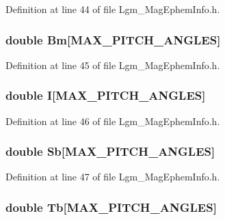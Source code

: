 Definition at line 44 of file Lgm\_\-MagEphemInfo.h.\hypertarget{struct_lgm___mag_ephem_info_58b19efd51438b84ace93c628b985f64}{
\subsubsection[{Bm}]{\setlength{\rightskip}{0pt plus 5cm}double {\bf Bm}\mbox{[}MAX\_\-PITCH\_\-ANGLES\mbox{]}}}
\label{struct_lgm___mag_ephem_info_58b19efd51438b84ace93c628b985f64}




Definition at line 45 of file Lgm\_\-MagEphemInfo.h.\hypertarget{struct_lgm___mag_ephem_info_f7c4c1569cb66f578b4bdef738b7e920}{
\subsubsection[{I}]{\setlength{\rightskip}{0pt plus 5cm}double {\bf I}\mbox{[}MAX\_\-PITCH\_\-ANGLES\mbox{]}}}
\label{struct_lgm___mag_ephem_info_f7c4c1569cb66f578b4bdef738b7e920}




Definition at line 46 of file Lgm\_\-MagEphemInfo.h.\hypertarget{struct_lgm___mag_ephem_info_b7e342e135c0c1f98b60578a6accaa87}{
\subsubsection[{Sb}]{\setlength{\rightskip}{0pt plus 5cm}double {\bf Sb}\mbox{[}MAX\_\-PITCH\_\-ANGLES\mbox{]}}}
\label{struct_lgm___mag_ephem_info_b7e342e135c0c1f98b60578a6accaa87}




Definition at line 47 of file Lgm\_\-MagEphemInfo.h.\hypertarget{struct_lgm___mag_ephem_info_002672c07e6566f1824fb7d9f81228a2}{
\subsubsection[{Tb}]{\setlength{\rightskip}{0pt plus 5cm}double {\bf Tb}\mbox{[}MAX\_\-PITCH\_\-ANGLES\mbox{]}}}
\label{struct_lgm___mag_ephem_info_002672c07e6566f1824fb7d9f81228a2}




